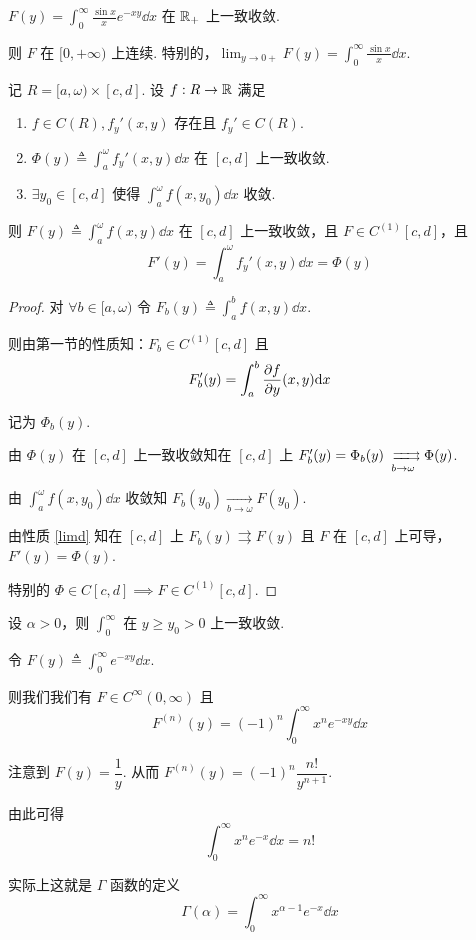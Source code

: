 \begin{example}
    $F(y)=\displaystyle\int_0^\infty\frac{\sin x}{x}e^{-xy}\dd x$ 在 $\mathbb{R}_+$ 上一致收敛.

    则 $F$ 在 $[0,+\infty)$ 上连续. 特别的，$\displaystyle\lim_{y\to 0+}F(y)=\int_0^\infty\frac{\sin x}{x}\dd x$.
\end{example}


\begin{property}
    记 $R=[a,\omega)\times [c,d]$. 设 $f:R\to\mathbb{R}$ 满足

    \begin{enumerate}
        \item $f\in C(R),f_y'(x,y)$ 存在且 $f_y'\in C(R)$.
        
        \item $\Phi(y)\triangleq\displaystyle\int_a^\omega f_y'(x,y)\dd x$ 在 $[c,d]$ 上一致收敛.
        
        \item $\exists y_0\in[c,d]$ 使得 $\displaystyle\int_a^\omega f(x,y_0)\dd x$ 收敛.
    \end{enumerate}

    则 $F(y)\triangleq\displaystyle\int_a^\omega f(x,y)\dd x$ 在 $[c,d]$ 上一致收敛，且 $F\in C^{(1)}[c,d]$，且
$$
F'(y)=\int_a^\omega f_y'(x,y)\dd x=\Phi(y)
$$
\end{property}
\begin{proof}
    对 $\forall b\in [a,\omega)$ 令 $F_b(y)\triangleq\displaystyle\int_a^b f(x,y)\dd x$.

    则由第一节的性质知：$F_b\in C^{(1)}[c,d]$ 且
$$
F_b'(y)=\int_a^b\frac{\partial{f}}{\partial{y}}(x,y)\mathrm{d} x
$$

    记为 $\Phi_b(y)$.

    由 $\Phi(y)$ 在 $[c,d]$ 上一致收敛知在 $[c,d]$ 上 $F_b'(y)=\Phi_b(y)\xrightrightarrows[b\to\omega]{}\Phi(y)$.

    由 $\displaystyle\int_a^\omega f(x,y_0)\dd x$ 收敛知 $F_b(y_0)\xrightarrow[b\to\omega]{}F(y_0)$.

    由性质 \ref{limd} 知在 $[c,d]$ 上 $F_b(y)\rightrightarrows F(y)$ 且 $F$ 在 $[c,d]$ 上可导，$F'(y)=\Phi(y)$.

    特别的 $\Phi\in C[c,d]\implies F\in C^{(1)}[c,d]$.
\end{proof}

\begin{example}
    设 $\alpha>0$，则 $\displaystyle\int_0^\infty$ 在 $y\ge y_0>0$ 上一致收敛.

    令 $F(y)\triangleq\displaystyle\int_0^\infty e^{-xy}\dd x$.

    则我们我们有 $F\in C^\infty(0,\infty)$ 且
$$
F^{(n)}(y)=(-1)^n\int_0^\infty x^ne^{-xy}\dd x
$$

    注意到 $F(y)=\dfrac{1}{y}$. 从而 $F^{(n)}(y)=(-1)^n\dfrac{n!}{y^{n+1}}$.

    由此可得
$$
\int_0^\infty x^ne^{-x}\dd x=n!
$$

    实际上这就是 $\Gamma$ 函数的定义
$$
\Gamma(\alpha)=\int_0^\infty x^{\alpha-1}e^{-x}\dd x
$$
\end{example}

